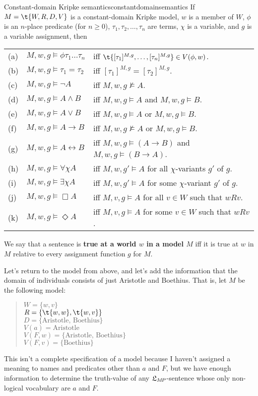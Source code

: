 \begin{definition}{Constant-domain Kripke semantics}{constantdomainsemantics}
  If $\Mfr = \t{W,R,D,V}$ is a constant-domain Kripke model, $w$ is a member of
  $W$, $\phi$ is an $n$-place predicate (for $n\geq 0$),
  $\tau_1,\tau_{2},\ldots,\tau_{n}$ are terms, $\chi$ is a variable, and $g$ is a
  variable assignment, then
  
  \medskip\hspace{-4mm}
  \begin{tabular}{lll}
    (a) & $M,w,g \models \phi \tau_1\ldots \tau_n$ &iff $\t{[\tau_1]^{M,g},\ldots,[\tau_n]^{M,g}} \in V(\phi,w)$.\\
    (b) & $M,w,g \models \tau_1=\tau_2$ &iff $[\tau_1]^{M,g} = [\tau_2]^{M,g}$.\\
    (c) & $M,w,g \models \neg A$ &iff $M,w,g \not\models A$.\\
    (d) & $M,w,g \models A \land B$ &iff $M,w,g \models A$ and $M,w,g \models B$.\\
    (e) & $M,w,g \models A \lor B$ &iff $M,w,g \models A$ or $M,w,g \models B$.\\
    (f) & $M,w,g \models A \to B$ &iff $M,w,g \not\models A$ or $M,w,g \models B$.\\
    (g) & $M,w,g \models A \leftrightarrow B$ &iff $M,w,g \models (A\to B)$ and $M,w,g \models (B\to A)$.\\
    (h) & $M,w,g \models \forall \chi A$ &iff $M,w,g' \models A$ for all $\chi$-variants $g'$ of $g$.\\
    (i) & $M,w,g \models \exists \chi A$ &iff $M,w,g' \models A$ for some $\chi$-variant $g'$ of $g$.\\
    (j) & $M,w,g \models \Box A$ &iff $M,v,g \models A$ for all $v\in W$ such that $wRv$.\\
    (k) & $M,w,g \models \Diamond A$ &iff $M,v,g \models A$ for some $v\in W$ such that $wRv$.
  \end{tabular}

\end{definition}

We say that a sentence is \textbf{true at a world $w$ in a model $M$} iff it
is true at $w$ in $M$ relative to every assignment function $g$ for $M$. 

Let's return to the model from above, and let's add the information that the
domain of individuals consists of just Aristotle and Boethius. That is, let $M$
be the following model:
%
\begin{quote}
  $W = \{ w,v \}$\\
  $R = \{ \t{w,w}, \t{w,v} \}$\\
  $D = \{ \text{Aristotle, Boethius} \}$\\
  $V(a) = \text{Aristotle}$\\
  $V(F,w) = \{ \text{Aristotle, Boethius} \}$\\
  $V(F,v) = \{ \text{Boethius} \}$
\end{quote}
%
This isn't a complete specification of a model because I haven't assigned a
meaning to names and predicates other than $a$ and $F$, but we have enough
information to determine the truth-value of any $\mathfrak{L}_{M\!P}$-sentence whose only
non-logical vocabulary are $a$ and $F$.

